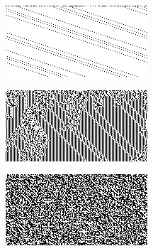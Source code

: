 \begin{figure}[htbp]
\begin{subfigure}[b]{.03\linewidth}
    \caption*{}
  \end{subfigure}
  \begin{subfigure}[b]{.31\linewidth}
    \centering
    \includegraphics[width=\linewidth]{figures/three_simple_eca.png}
    \caption{}
   \label{fig:simple}
  \end{subfigure}
  \begin{subfigure}[b]{.31\linewidth}
    \centering
    \includegraphics[width=\linewidth]{figures/three_complex_eca.png}
    \caption{}
   \label{fig:complex}
  \end{subfigure}
  \begin{subfigure}[b]{.31\linewidth}
    \centering
    \includegraphics[width=\linewidth]{figures/three_random_eca.png}

\end{subfigure}
\end{figure}
